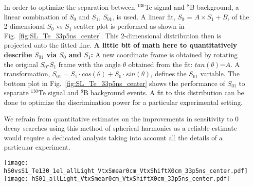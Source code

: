 In order to optimize the separation between $^{130}$Te signal and $^{8}$B
background, a linear combination of $S_0$ and $S_1$, $S_{01}$, is
used. A linear fit, $S_0$ = $A \times S_1 + B$, of the 2-dimensional $S_0$
vs $S_1$ scatter plot is performed as shown in
Fig.~\ref{fig:SL_Te_33p5ns_center}.  This 2-dimensional
distribution then is projected onto the fitted line. {\bf A little bit of
  math here to quantitatively describe $S_{01}$ via $S_0$ and $S_1$:}
A new coordinate frame is obtained by rotating the original
$S_0$-$S_1$ frame with the angle $\theta$ obtained from the fit:
$tan(\theta)$=$A$. A transformation, $S_{01} = S_1 \cdot cos(\theta) +
S_0 \cdot sin(\theta)$, defines the $S_{01}$ variable. The bottom plot in Fig.~\ref{fig:SL_Te_33p5ns_center} 
shows the performance of $S_{01}$ to separate $^{130}$Te signal and $^{8}$B
background events. A fit to this distribution can be done to optimize the
discrimination power for a particular experimental setting.

We refrain from quantitative estimates on the improvements in sensitivity
to 0{\nbb} decay searches using this method of spherical harmonics as a
reliable estimate would require a dedicated analysis taking into
account all the details of a particular experiment.

\begin{figure*}[h]
  \centering
  \texttt{[image: hS0vsS1\_Te130\_1el\_allLight\_VtxSmear0cm\_VtxShiftX0cm\_33p5ns\_center.pdf]}
  \texttt{[image: hS01\_allLight\_VtxSmear0cm\_VtxShiftX0cm\_33p5ns\_center.pdf]}
  \caption{Spherical harmonics comparison between $^{130}$Te 0{\nbb}
    decay signal ($Q=2.529$~MeV) (\emph{red}) and $^{8}$B solar
    neutrinos background (\emph{blue}) for 1000 simulated events
    originated at the center of the sphere. $^{8}$B events are
    implemented as 2.529~MeV electrons with initial direction along
    $x$-axis. Perfect vertex reconstruction - true vertex position is
    used. Time cut of 33.5~ns on the photon arrival time is
    applied. \emph{Top left:} $S_0$ versus $S_1$ scatter plot. Black
    dotted line is a linear fit of these 2D histograms. Variable
    $S_{01}$ is defined as a projection of 2D distribution onto this
    linear fit. 
    \emph{Bottom:} $S_{01}$ distribution for the signal and
    background.}
\label{fig:SL_Te_33p5ns_center}
\end{figure*}


